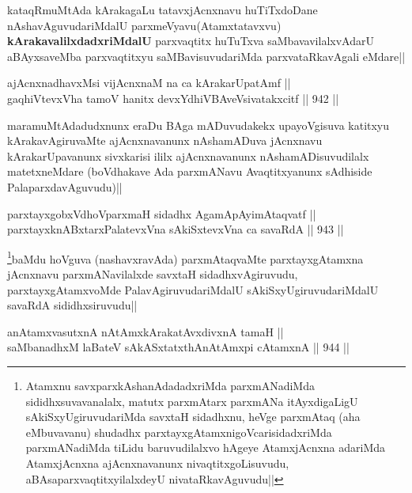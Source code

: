 \begin{artha}
kataqRmuMtAda kArakagaLu tatavxjAcnxnavu huTiTxdoDane nAshavAguvudariMdalU parxmeVyavu(Atamxtatavxvu) \textbf{kArakavalilxdadxriMdalU} parxvaqtitx huTuTxva saMbavavilalxvAdarU aBAyxsaveMba parxvaqtitxyu saMBavisuvudariMda parxvataRkavAgali eMdare||
\end{artha}

\begin{shl}
ajAcnxnadhavxMsi vijAcnxnaM na ca kArakarUpatAmf || \\
gaqhiVtevxVha tamoV hanitx devxYdhiVBAveV\s sivatakxcitf ||  942 ||  
\end{shl}

\begin{artha}
maramuMtAdadudxnunx eraDu BAga mADuvudakekx upayoVgisuva katitxyu kArakavAgiruvaMte ajAcnxnavanunx nAshamADuva jAcnxnavu kArakarUpavanunx sivxkarisi ililx ajAcnxnavanunx nAshamADisuvudilalx matetxneMdare (boVdhakave Ada parxmANavu Avaqtitxyanunx sAdhiside PalaparxdavAguvudu)||
\end{artha}

\begin{shl}
parxtayxgobxVdhoV\s parxmaH sidadhx AgamApAyimAtaqvatf || \\
parxtayxknABxtarxPalatevxVna sAkiSxtevxVna ca savaRdA ||  943 ||  
\end{shl}

\begin{artha}
\footnote{Atamxnu savxparxkAshanAdadadxriMda parxmANadiMda sididhxsuvavanalalx, matutx parxmAtarx parxmANa itAyxdigaLigU sAkiSxyUgiruvudariMda savxtaH sidadhxnu, heVge parxmAtaq (aha eMbuvavanu) shudadhx parxtayxgAtamxnigoVcarisidadxriMda parxmANadiMda  tiLidu baruvudilalxvo hAgeye AtamxjAcnxna adariMda AtamxjAcnxna ajAcnxnavanunx nivaqtitxgoLisuvudu, aBAsaparxvaqtitxyilalxdeyU nivataRkavAguvudu||}baMdu hoVguva (nashavxravAda) parxmAtaqvaMte parxtayxgAtamxna jAcnxnavu parxmANavilalxde savxtaH sidadhxvAgiruvudu, parxtayxgAtamxvoMde PalavAgiruvudariMdalU sAkiSxyUgiruvudariMdalU savaRdA sididhxsiruvudu||
\end{artha}


\begin{shl}
anAtamxvasutxnA nA\s \s tAmx\s kArakatAvxdivxnA tamaH || \\
saMbanadhxM laBateV sAkASxtatxthA\s nAtAmx\s pi cA\s \s tamxnA ||  944 ||  
\end{shl}

